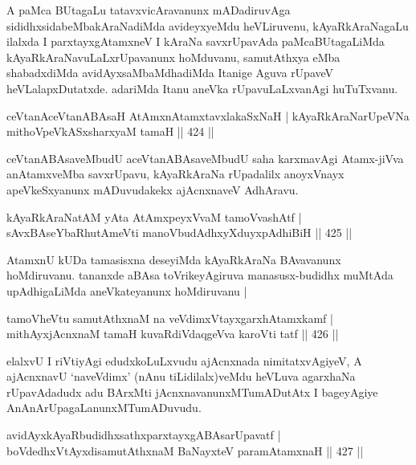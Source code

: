 \begin{artha}
A paMca BUtagaLu tatavxvicAravanunx mADadiruvAga sididhxsidabeMbakAraNadiMda avideyxyeMdu heVLiruvenu, kAyaRkAraNagaLu ilalxda I parxtayxgAtamxneV  I kAraNa savxrUpavAda paMcaBUtagaLiMda kAyaRkAraNavuLaLxrUpavanunx hoMduvanu, samutAthxya eMba shabadxdiMda avidAyxsaMbaMdhadiMda Itanige Aguva rUpaveV heVLalapxDutatxde. adariMda Itanu aneVka rUpavuLaLxvanAgi huTuTxvanu.
\end{artha}


\begin{shl}
ceVtanAceVtanABAsaH AtAmxnAtamxtavxlakaSxNaH |
kAyaRkAraNarUpeVNa mithoVpeVkASxsharxyaM tamaH \hfill  || 424 ||
\end{shl}

\begin{artha}
ceVtanABAsaveMbudU aceVtanABAsaveMbudU saha karxmavAgi Atamx-jiVva anAtamxveMba savxrUpavu, kAyaRkAraNa rUpadalilx  anoyxVnayx apeVkeSxyanunx mADuvudakekx ajAcnxnaveV AdhAravu.
\end{artha}

\begin{shl}
kAyaRkAraNatAM yAta AtAmx\s peyxVvaM tamoVvashAtf |
sAvxBAseYbaRhutAmeVti manoVbudAdhxyXduyxpAdhiBiH \hfill  || 425 ||
\end{shl}

\begin{artha}
AtamxnU kUDa tamasisxna deseyiMda kAyaRkAraNa BAvavanunx
hoMdiruvanu. tananxde aBAsa toVrikeyAgiruva manasusx-budidhx muMtAda
upAdhigaLiMda aneVkateyanunx hoMdiruvanu |
\end{artha}

\begin{shl}
tamoVheVtu samutAthxnaM na veVdimxVtayxgarxhAtamxkamf |
mithAyxjAcnxnaM tamaH kuvaRdiVdaqgeVva karoVti tatf \hfill  || 426 ||
\end{shl}

\begin{artha}
elalxvU I riVtiyAgi edudxkoLuLxvudu ajAcnxnada nimitatxvAgiyeV, A  ajAcnxnavU `naveVdimx' (nAnu tiLidilalx)veMdu heVLuva agarxhaNa rUpavAdadudx adu BArxMti jAcnxnavanunxMTumADutAtx I bageyAgiye AnAnArUpagaLanunxMTumADuvudu.
\end{artha}

\begin{shl}
avidAyxkAyaRbudidhxsathxparxtayxgABAsarUpavatf |
boVdedhxVtAyxdisamutAthxnaM BaNayxteV paramAtamxnaH \hfill  || 427 ||
\end{shl}

